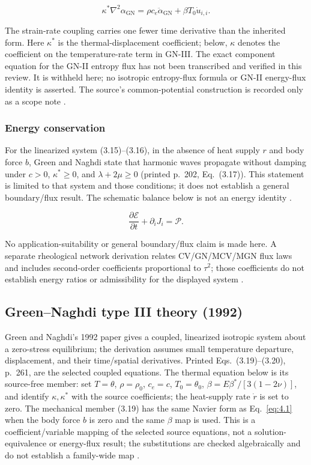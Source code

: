\begin{equation}
\kappa^*\nabla^2\alpha_{\mathrm{GN}} = \rho c_e \ddot{\alpha}_{\mathrm{GN}} + \beta T_0 \dot{u}_{i,i}.
\label{eq:4.11}
\end{equation}

The strain-rate coupling carries one fewer time derivative than the inherited form. Here $\kappa^*$ is the thermal-displacement coefficient; below, $\kappa$ denotes the coefficient on the temperature-rate term in GN-III. The exact component equation for the GN-II entropy flux has not been transcribed and verified in this review. It is withheld here; no isotropic entropy-flux formula or GN-II energy-flux identity is asserted. The source's common-potential construction is recorded only as a scope note \cite{Green1993}.

\subsubsection{Energy conservation}

For the linearized system (3.15)--(3.16), in the absence of heat supply $r$ and body force $b$, Green and Naghdi state that harmonic waves propagate without damping under $c>0$, $\kappa^*\geq0$, and $\lambda+2\mu\geq0$ (printed p.~202, Eq.~(3.17)). This statement is limited to that system and those conditions; it does not establish a general boundary/flux result. The schematic balance below is not an energy identity \cite{Green1993}.

\begin{equation}
\frac{\partial\mathcal{E}}{\partial t} + \partial_i J_i = \mathcal{P}.
\label{eq:4.13}
\end{equation}

No application-suitability or general boundary/flux claim is made here. A separate rheological network derivation relates CV/GN/MCV/MGN flux laws and includes second-order coefficients proportional to $\tau^2$; those coefficients do not establish energy ratios or admissibility for the displayed system \cite{Huang2025}.

\subsection{Green--Naghdi type III theory (1992)}
\label{sec:4.6}

Green and Naghdi's 1992 paper gives a coupled, linearized isotropic system about a zero-stress equilibrium; the derivation assumes small temperature departure, displacement, and their time/spatial derivatives. Printed Eqs.~(3.19)--(3.20), p.~261, are the selected coupled equations. The thermal equation below is its source-free member: set $T=\theta$, $\rho=\rho_0$, $c_e=c$, $T_0=\theta_0$, $\beta=E\beta^*/[3(1-2\nu)]$, and identify $\kappa,\kappa^*$ with the source coefficients; the heat-supply rate $\dot r$ is set to zero. The mechanical member (3.19) has the same Navier form as Eq.~\eqref{eq:4.1} when the body force $b$ is zero and the same $\beta$ map is used. This is a coefficient/variable mapping of the selected source equations, not a solution-equivalence or energy-flux result; the substitutions are checked algebraically and do not establish a family-wide map \cite{GreenGN1992}.

